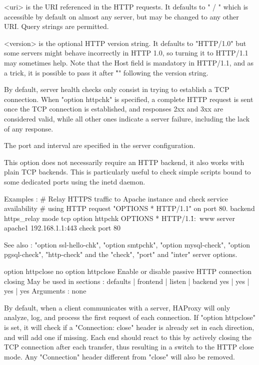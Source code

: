     <uri>     is the URI referenced in the HTTP requests. It defaults to " / "
              which is accessible by default on almost any server, but may be
              changed to any other URI. Query strings are permitted.

    <version> is the optional HTTP version string. It defaults to "HTTP/1.0"
              but some servers might behave incorrectly in HTTP 1.0, so turning
              it to HTTP/1.1 may sometimes help. Note that the Host field is
              mandatory in HTTP/1.1, and as a trick, it is possible to pass it
              after "\r\n" following the version string.

  By default, server health checks only consist in trying to establish a TCP
  connection. When "option httpchk" is specified, a complete HTTP request is
  sent once the TCP connection is established, and responses 2xx and 3xx are
  considered valid, while all other ones indicate a server failure, including
  the lack of any response.

  The port and interval are specified in the server configuration.

  This option does not necessarily require an HTTP backend, it also works with
  plain TCP backends. This is particularly useful to check simple scripts bound
  to some dedicated ports using the inetd daemon.

  Examples :
      # Relay HTTPS traffic to Apache instance and check service availability
      # using HTTP request "OPTIONS * HTTP/1.1" on port 80.
      backend https_relay
          mode tcp
          option httpchk OPTIONS * HTTP/1.1\r\nHost:\ www
          server apache1 192.168.1.1:443 check port 80

  See also : "option ssl-hello-chk", "option smtpchk", "option mysql-check",
             "option pgsql-check", "http-check" and the "check", "port" and
             "inter" server options.


option httpclose
no option httpclose
  Enable or disable passive HTTP connection closing
  May be used in sections :   defaults | frontend | listen | backend
                                 yes   |    yes   |   yes  |   yes
  Arguments : none

  By default, when a client communicates with a server, HAProxy will only
  analyze, log, and process the first request of each connection. If "option
  httpclose" is set, it will check if a "Connection: close" header is already
  set in each direction, and will add one if missing. Each end should react to
  this by actively closing the TCP connection after each transfer, thus
  resulting in a switch to the HTTP close mode. Any "Connection" header
  different from "close" will also be removed.


